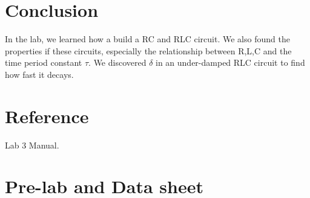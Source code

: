 \documentclass{article}
\begin{document}
\section{Conclusion}
In the lab, we learned how a build a RC and RLC circuit. We also found the properties if these circuits, especially the relationship between R,L,C and the time period constant $\tau$. We discovered $\delta$ in an under-damped RLC circuit to find how fast it decays.

\section{Reference}
Lab 3 Manual.

\section{Pre-lab and Data sheet}
\end{document}
